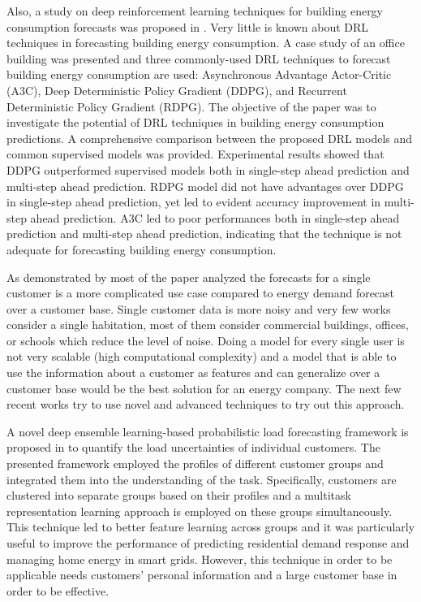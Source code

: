 Also, a study on deep reinforcement learning techniques for building energy consumption forecasts was proposed in \cite{LIU2020109675}.
Very little is known about DRL techniques in forecasting building energy consumption.
A case study of an office building was presented and three commonly-used DRL techniques to forecast building energy consumption are used: Asynchronous Advantage Actor-Critic (A3C), Deep Deterministic Policy Gradient (DDPG), and Recurrent Deterministic Policy Gradient (RDPG).
The objective of the paper was to investigate the potential of DRL techniques in building energy consumption predictions.
A comprehensive comparison between the proposed DRL models and common supervised models was provided.
Experimental results showed that DDPG outperformed supervised models both in single-step ahead prediction and multi-step ahead prediction.
RDPG model did not have advantages over DDPG in single-step ahead prediction, yet led to evident accuracy improvement in multi-step ahead prediction.
A3C led to poor performances both in single-step ahead prediction and multi-step ahead prediction, indicating that the technique is not adequate for forecasting building energy consumption.

As demonstrated by most of the paper analyzed the forecasts for a single customer is a more complicated use case compared to energy demand forecast over a customer base.
Single customer data is more noisy and very few works consider a single habitation, most of them consider commercial buildings, offices, or schools which reduce the level of noise.
Doing a model for every single user is not very scalable (high computational complexity) and a model that is able to use the information about a customer as features and can generalize over a customer base would be the best solution for an energy company.
The next few recent works try to use novel and advanced techniques to try out this approach.

A novel deep ensemble learning-based probabilistic load forecasting framework is proposed in \cite{YANG2019116324} to quantify the load uncertainties of individual customers.
The presented framework employed the profiles of different customer groups and integrated them into the understanding of the task.
Specifically, customers are clustered into separate groups based on their profiles and a multitask representation learning approach is employed on these groups simultaneously.
This technique led to better feature learning across groups and it was particularly useful to improve the performance of predicting residential demand response and managing home energy in smart grids.
However, this technique in order to be applicable needs customers’ personal information and a large customer base in order to be effective.

